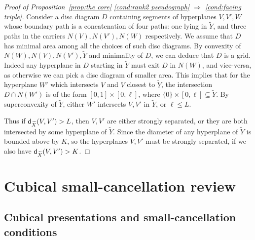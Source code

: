 \documentclass[12pt,oneside]{amsart}
\theoremstyle{definition}
\theoremstyle{definition}
\theoremstyle{remark}
\newcommand{\dist}{\textup{\textsf{d}}}
\begin{document}
\begin{proof}[Proof of Proposition~\ref{prop:the core} \eqref{cond:rank2 pseudograph} $\Rightarrow$ \eqref{cond:facing triple}]
Consider a disc diagram $D$ containing segments of hyperplanes $V,V', W$ whose boundary path is a concatenation of four paths: one lying in $\widetilde Y$, and three paths in the carriers $N(V), N(V'), N(W)$ respectively. We assume that $D$ has minimal area among all the choices of such disc diagrams. By convexity of $N(W), N(V), N(V'), \widetilde Y$ and minimality of $D$, we can deduce that $D$ is a grid. Indeed any hyperplane in $D$ starting in $\widetilde Y$ must exit $D$ in $N(W)$, and vice-versa, as otherwise we can pick a disc diagram of smaller area. This implies that for the hyperplane $W'$ which intersects $V$ and $V$ closest to $\widetilde Y$, the intersection $D\cap N(W')$ is of the form $[0,1]\times [0, \ell]$, where $\{0\}\times [0, \ell]\subseteq \widetilde Y$. By superconvexity of $\widetilde Y$, either $W'$ intersects $V, V'$ in $\widetilde Y$, or $\ell\leq L$.

Thus if $\dist_{\widetilde X}(V, V')> L$, then $V, V'$ are either strongly separated, or they are both intersected by some hyperplane of $\widetilde Y$. Since the diameter of any hyperplane of $\widetilde Y$ is bounded above by $K$, so the hyperplanes $V, V'$ must be strongly separated, if we also have $\dist_{\widetilde X}(V, V')> K$.
\end{proof}




\section{Cubical small-cancellation review}\label{sec: cubical small cancellation}

\subsection{Cubical presentations and small-cancellation conditions}
\end{document}
